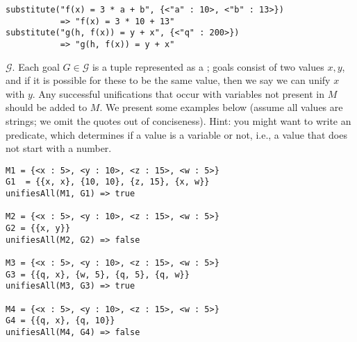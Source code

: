 
\par{
\begin{verbatim}
substitute("f(x) = 3 * a + b", {<"a" : 10>, <"b" : 13>})
           => "f(x) = 3 * 10 + 13"
substitute("g(h, f(x)) = y + x", {<"q" : 200>})          
           => "g(h, f(x)) = y + x" 
\end{verbatim}
}

 $\mathcal{G}$. Each goal $G \in \mathcal{G}$ is a tuple represented as a ; goals consist of two values $x, y$, and if it is possible for these to be the same value, then we say we can unify $x$ with $y$. Any successful unifications that occur with variables not present in $M$ should be added to $M$. We present some examples below (assume all values are strings; we omit the quotes out of conciseness). Hint: you might want to write an  predicate, which determines if a value is a variable or not, i.e., a value that does not start with a number.

\par{
\begin{verbatim}
M1 = {<x : 5>, <y : 10>, <z : 15>, <w : 5>}
G1  = {{x, x}, {10, 10}, {z, 15}, {x, w}}
unifiesAll(M1, G1) => true

M2 = {<x : 5>, <y : 10>, <z : 15>, <w : 5>}
G2 = {{x, y}}
unifiesAll(M2, G2) => false

M3 = {<x : 5>, <y : 10>, <z : 15>, <w : 5>}
G3 = {{q, x}, {w, 5}, {q, 5}, {q, w}}
unifiesAll(M3, G3) => true

M4 = {<x : 5>, <y : 10>, <z : 15>, <w : 5>}
G4 = {{q, x}, {q, 10}}
unifiesAll(M4, G4) => false
\end{verbatim}
}


